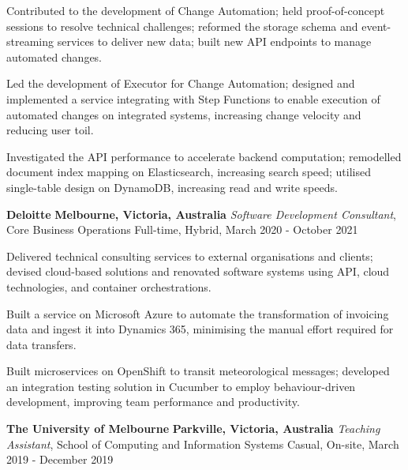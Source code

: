 \documentclass{cv}
\begin{document}
\begin{list}{}{\setlength{\leftmargin}{0pt}}
\begin{list}{\raisebox{2.0pt}{\tiny$\bullet$}\space}{\setlength{\leftmargin}{11.2pt}}
        \item Contributed to the development of Change Automation; held proof-of-concept sessions to resolve technical challenges; reformed the storage schema and event-streaming services to deliver new data; built new API endpoints to manage automated changes.
        \item Led the development of Executor for Change Automation; designed and implemented a service integrating with Step Functions to enable execution of automated changes on integrated systems, increasing change velocity and reducing user toil.
        \item Investigated the API performance to accelerate backend computation; remodelled document index mapping on Elasticsearch, increasing search speed; utilised single-table design on DynamoDB, increasing read and write speeds.
    \end{list}
\item
    \textbf{Deloitte} \hfill \textbf{Melbourne, Victoria, Australia}%
    \vspace{1.0pt} \newline 
    {\textit{Software Development Consultant}, Core Business Operations} \hfill {Full-time, Hybrid, March 2020 - October 2021}%
    \begin{list}{\raisebox{2.0pt}{\tiny$\bullet$}\space}{\setlength{\leftmargin}{11.2pt}}
        \itemsep -5.0pt \vspace{-4.0pt}
        \item Delivered technical consulting services to external organisations and clients; devised cloud-based solutions and renovated software systems using API, cloud technologies, and container orchestrations.
        \item Built a service on Microsoft Azure to automate the transformation of invoicing data and ingest it into Dynamics 365, minimising the manual effort required for data transfers.
        \item Built microservices on OpenShift to transit meteorological messages; developed an integration testing solution in Cucumber to employ behaviour-driven development, improving team performance and productivity.
    \end{list}
\item
    \textbf{The University of Melbourne} \hfill \textbf{Parkville, Victoria, Australia}%
    \vspace{1.0pt} \newline 
    {\textit{Teaching Assistant}, School of Computing and Information Systems} \hfill {Casual, On-site, March 2019 - December 2019}%

\end{list}
\end{document}
